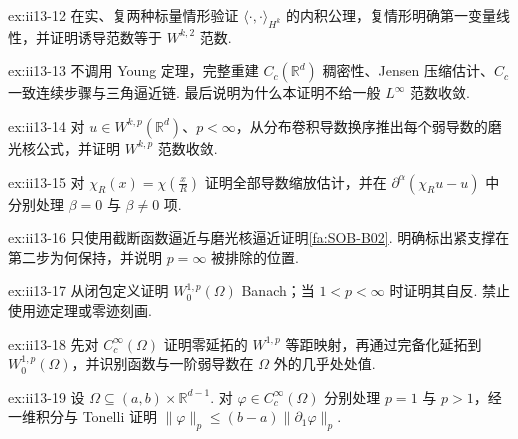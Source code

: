 \begin{FAExercise}[\(\displaystyle H^k\) 内积]{ex:ii13-12}
在实、复两种标量情形验证 \(\displaystyle\langle\cdot,\cdot\rangle_{H^k}\) 的内积公理，复情形明确第一变量线性，并证明诱导范数等于 \(\displaystyle W^{k,2}\) 范数.
\end{FAExercise}

\begin{FAExercise}{ex:ii13-13}
不调用 Young 定理，完整重建 \(\displaystyle C_c(\mathbb R^d)\) 稠密性、Jensen 压缩估计、\(\displaystyle C_c\) 一致连续步骤与三角逼近链. 最后说明为什么本证明不给一般 \(\displaystyle L^\infty\) 范数收敛.
\end{FAExercise}

\begin{FAExercise}{ex:ii13-14}
对 \(\displaystyle u\in W^{k,p}(\mathbb R^d)\)、\(\displaystyle p<\infty\)，从分布卷积导数换序推出每个弱导数的磨光核公式，并证明 \(\displaystyle W^{k,p}\) 范数收敛.
\end{FAExercise}

\begin{FAExercise}[截断函数逼近]{ex:ii13-15}
对 \(\displaystyle\chi_R(x)=\chi(\frac{x}{R})\) 证明全部导数缩放估计，并在 \(\displaystyle\partial^\alpha(\chi_Ru-u)\) 中分别处理 \(\displaystyle\beta=0\) 与 \(\displaystyle\beta\neq0\) 项.
\end{FAExercise}

\begin{FAExercise}[全空间光滑紧支撑密度]{ex:ii13-16}
只使用截断函数逼近与磨光核逼近证明\autoref{fa:SOB-B02}. 明确标出紧支撑在第二步为何保持，并说明 \(\displaystyle p=\infty\) 被排除的位置.
\end{FAExercise}

\begin{FAExercise}{ex:ii13-17}
从闭包定义证明 \(\displaystyle W_0^{1,p}(\Omega)\) Banach；当 \(\displaystyle1<p<\infty\) 时证明其自反. 禁止使用迹定理或零迹刻画.
\end{FAExercise}

\begin{FAExercise}[零延拓]{ex:ii13-18}
先对 \(\displaystyle C_c^\infty(\Omega)\) 证明零延拓的 \(\displaystyle W^{1,p}\) 等距映射，再通过完备化延拓到 \(\displaystyle W_0^{1,p}(\Omega)\)，并识别函数与一阶弱导数在 \(\displaystyle\Omega\) 外的几乎处处值.
\end{FAExercise}

\begin{FAExercise}{ex:ii13-19}
设 \(\displaystyle\Omega\subseteq(a,b)\times\mathbb R^{d-1}\). 对 \(\displaystyle\varphi\in C_c^\infty(\Omega)\) 分别处理 \(\displaystyle p=1\) 与 \(\displaystyle p>1\)，经一维积分与 Tonelli 证明 \(\displaystyle\|\varphi\|_p\leqslant(b-a)\|\partial_1\varphi\|_p\).
\end{FAExercise}

